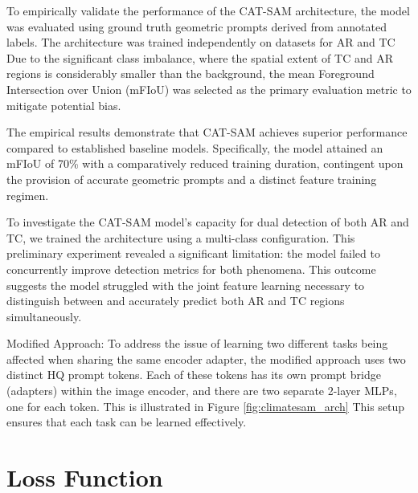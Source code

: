 To empirically validate the performance of the CAT-SAM architecture, the model was evaluated using ground truth geometric prompts derived from annotated labels. The architecture was trained independently on datasets for AR and TC Due to the significant class imbalance, where the spatial extent of TC and AR regions is considerably smaller than the background, the mean Foreground Intersection over Union (mFIoU) was selected as the primary evaluation metric to mitigate potential bias. 

The empirical results demonstrate that CAT-SAM achieves superior performance compared to established baseline models. Specifically, the model attained an mFIoU of 70\% with a comparatively reduced training duration, contingent upon the provision of accurate geometric prompts and a distinct feature training regimen.

To investigate the CAT-SAM model's capacity for dual detection of both AR and TC, we trained the architecture using a multi-class configuration.  This preliminary experiment revealed a significant limitation: the model failed to concurrently improve detection metrics for both phenomena. This outcome suggests the model struggled with the joint feature learning necessary to distinguish between and accurately predict both AR and TC regions simultaneously.

Modified Approach:
To address the issue of learning two different tasks being affected when sharing the same encoder adapter, the modified approach uses two distinct HQ prompt tokens. Each of these tokens has its own prompt bridge (adapters) within the image encoder, and there are two separate 2-layer MLPs, one for each token. This is illustrated in Figure \ref{fig:climatesam_arch} This setup ensures that each task can be learned effectively.

\section{Loss Function}

